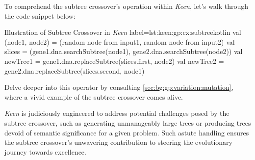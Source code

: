   To comprehend the subtree crossover's operation within \textit{Keen}, let's 
  walk through the code snippet below:

    \begin{code}{
      Illustration of Subtree Crossover in \textit{Keen}
    }{label=lst:keen:gp:cx:subtree}{kotlin}
      val (node1, node2) = (random node from input1, random node from input2)
      val slices = (gene1.dna.searchSubtree(node1), gene2.dna.searchSubtree(node2))
      val newTree1 = gene1.dna.replaceSubtree(slices.first, node2)
      val newTree2 = gene2.dna.replaceSubtree(slices.second, node1)
    \end{code}

  Delve deeper into this operator by consulting
  \vref{sec:bg:gp:variation:mutation}, where a vivid example of the subtree 
  crossover comes alive.

  \textit{Keen} is judiciously engineered to address potential challenges posed 
  by the subtree crossover, such as generating unmanageably large trees or 
  producing trees devoid of semantic significance for a given problem. Such 
  astute handling ensures the subtree crossover's unwavering contribution to 
  steering the evolutionary journey towards excellence.
